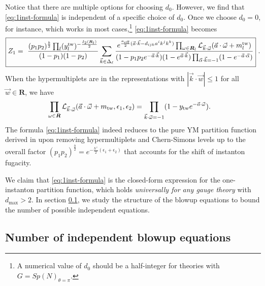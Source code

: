 \documentclass[letterpaper, 11pt]{article}
\def\CL{{\cal L}}
\def\e{\epsilon}
\def\w{\omega}
\begin{document}
Notice that there are multiple options for choosing $d_0$. However, we find that \eqref{eq:1inst-formula} is independent of a specific choice of $d_0$. Once we choose $d_0 = 0$, for instance, which works in most cases,\footnote{A numerical value of $d_0$ should be a half-integer for theories with $G = Sp(N)_{\theta=\pi}$.} \eqref{eq:1inst-formula} becomes
\begin{align}
\boxed{
  Z_1=\ \frac{(p_1p_2)^{\frac{b}{2}}\prod_{l}(y_{l}^{\text{tw}})^{-\frac{I_2(\boldsymbol{R}_l)}{2}}}{(1-p_1)(1-p_2)} \sum_{\vec{k}\in\Delta_\ell}\frac{e^{\frac{\kappa_{\text{eff}}}{2}(\vec{a}\cdot\vec{k}-d_{ijk}a^ik^jk^k)}\prod_{\w \in \boldsymbol{R}_l} \CL_{\vec{k}\cdot\vec{\w}}(\vec{a}\cdot \vec{\w} + m_{l}^\text{tw})}{(1-p_1p_2e^{-\vec{a}\cdot\vec{k}})(1-e^{\vec{a}\cdot\vec{k}})\prod_{\vec{\alpha}\cdot \vec{k}=-1}(1-e^{-\vec{a}\cdot\vec{\alpha}})}}\ .
\end{align} 
When the hypermultiplets are in the representations with $|\vec{k} \cdot \vec{w}|\le 1$ for all $\vec{w} \in \mathbf{R}$, we have
\begin{align}
  \label{eq:weight-expansion-non-sym}
  \prod_{\w \in \boldsymbol{R}} \CL_{\vec{k}\cdot\vec{\w}}(\vec{a}\cdot \vec{\w} + m_{\text{tw}}, \e_1,\e_2)  &=  \prod_{\vec{k}\cdot \vec{\w} = -1}(1-y_\text{tw} e^{-\vec{a}\cdot \vec{\w}}) .
\end{align}
The formula \eqref{eq:1inst-formula} indeed reduces to the pure YM partition function derived in \cite{Keller:2011ek, Keller:2012da} upon removing hypermultiplets and Chern-Simons levels up to the overall factor $(p_1 p_2)^{\frac{b}{2}} = e^{-\frac{h^\vee}{2} (\e_1 + \e_2)}$ that accounts for the shift of instanton fugacity. 

We claim that \eqref{eq:1inst-formula} is the closed-form expression for the one-instanton partition function, which holds \emph{universally for any gauge theory} with $d_{\text{max}}>2$.  
In section \ref{subsec:numd}, we study the structure of the blowup equations to bound the number of possible independent equations.  


\subsection{Number of independent blowup equations} \label{subsec:numd}
\end{document}
